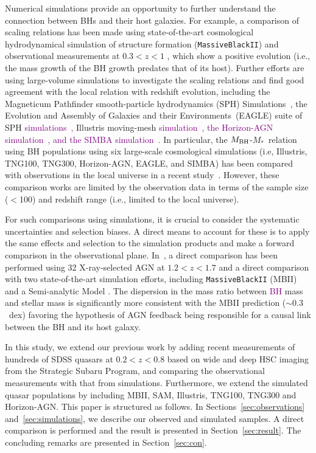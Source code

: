 \documentclass[twocolumn]{aastex631}
\newcommand{\red}[1]{\textcolor{purple}{#1}}
\def\smass{{$M_*$}}
\def\mbh{$M_{\rm BH}$}
\begin{document}
Numerical simulations provide an opportunity to further understand the connection between BHs and their host galaxies. For example, a comparison of scaling relations has been made using state-of-the-art cosmological hydrodynamical simulation of structure formation ({\tt MassiveBlackII}) and observational measurements at  $0.3<z<1$ \citep[e.g., ][]{DeG++15}, which show a positive evolution (i.e., the mass growth of the BH growth predates that of its host). Further efforts are using large-volume simulations to investigate the scaling relations and find good agreement with the local relation with redshift evolution, 
including the Magneticum Pathfinder smooth-particle hydrodynamics (SPH) Simulations~\citep{Steinborn2015}, the Evolution and Assembly of Galaxies and their Environments~(EAGLE) suite of SPH \red{simulations~\citep{Schaye2015, Crain2015, McAlpine2016},} Illustris moving-mesh \red{simulation~\citep{Genel2014, 2014MNRAS.444.1518V, Sijacki2015, Nelson2015, Li2019}, the Horizon-AGN simulation~\citep{2014MNRAS.444.1453D, 2016MNRAS.463.3948D, 2016MNRAS.460.2979V}, and the SIMBA simulation~\citep{Thomas2019, Dave2019}. }
In particular, the \mbh-\smass\ relation using BH populations using six large-scale cosmological simulations (i.e, Illustris, TNG100, TNG300, Horizon-AGN, EAGLE, and SIMBA) has been compared with observations in the local universe in a recent study~\citep{Habouzit2021}. However, these comparison works are limited by the observation data in terms of the sample size ($<$100) and redshift range (i.e., limited to the local universe).

For such comparisons using simulations, it is crucial to consider the systematic uncertainties and selection biases. A direct means to account for these is to apply the same effects and selection to the simulation products and make a forward comparison in the observational plane. In~\citet{Ding2020b}, a direct comparison has been performed using 32 X-ray-selected AGN at $1.2<z<1.7$ and a direct comparison with two state-of-the-art simulation efforts, including {\tt MassiveBlackII} (MBII) and a Semi-analytic Model \citep[SAM,][]{Menci2014, Menci2016}. The dispersion in the mass ratio between \red{BH} mass and stellar mass is significantly more consistent with the MBII prediction ($\sim0.3$~dex) favoring the hypothesis of AGN feedback being responsible for a causal link between the BH and its host galaxy.

In this study, we extend our previous work by adding recent measurements of hundreds of SDSS quasars at $0.2<z<0.8$ based on wide and deep HSC imaging from the Strategic Subaru Program, and comparing the observational measurements with that from simulations. Furthermore, we extend the simulated quasar populations by including MBII, SAM, Illustris, TNG100, TNG300 and Horizon-AGN. This paper is structured as follows. In Sections~\ref{sec:observations} and~\ref{sec:simulations}, we describe our observed and simulated samples. A direct comparison is performed and the result is presented in Section~\ref{sec:result}. The concluding remarks are presented in Section~\ref{sec:con}.
\end{document}
